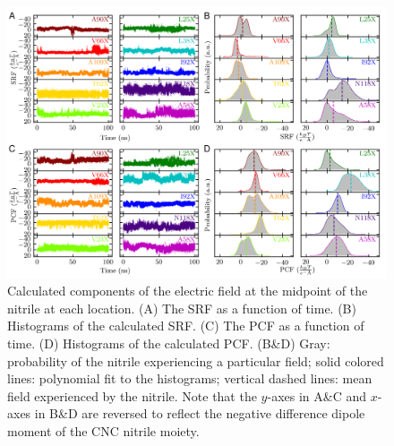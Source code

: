 \begin{figure}
    \center
    \includegraphics[width=\double]{figures-snase/combined_figure_fields.png}
    \caption[]{
        Calculated components of the electric field at the midpoint of the nitrile at each location. 
        (A) The SRF as a function of time. 
        (B) Histograms of the calculated SRF. 
        (C) The PCF as a function of time. 
        (D) Histograms of the calculated PCF. 
        (B\&D) Gray: probability of the nitrile experiencing a particular field; 
        solid colored lines: polynomial fit to the histograms; 
        vertical dashed lines: mean field experienced by the nitrile. 
        Note that the $y$-axes in A\&C and $x$-axes in B\&D are reversed to reflect the negative difference dipole moment of the CNC nitrile moiety.
    }
    \label{fig:snase-md_field}
\end{figure}

